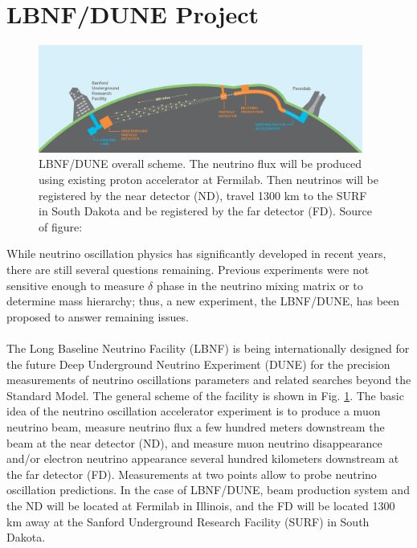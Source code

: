 
\section{LBNF/DUNE Project}
\begin{figure}
\caption{LBNF/DUNE overall scheme. The neutrino flux will be produced using existing proton accelerator at Fermilab. Then neutrinos will be registered by the near detector (ND), travel 1300 km to the SURF in South Dakota and be registered by the far detector (FD). Source of figure: \cite{ref_LBNFweb} }
\label{fig:LBNF_overallScheme}
\centering
\includegraphics[width=0.95\textwidth, keepaspectratio=true]{figs/LBNF_overallScheme.png} 
\end{figure}
While neutrino oscillation physics has significantly developed in recent years, there are still several questions remaining. Previous experiments were not sensitive enough to measure $\delta$ phase in the neutrino mixing matrix or to determine mass hierarchy; thus, a new experiment, the LBNF/DUNE, has been proposed to answer remaining issues.\\ \\
The Long Baseline Neutrino Facility (LBNF) is being internationally designed for the future Deep Underground Neutrino Experiment (DUNE) for the precision measurements of neutrino oscillations parameters and related searches beyond the Standard Model. The general scheme of the facility is shown in Fig. \ref{fig:LBNF_overallScheme}. The basic idea of the neutrino oscillation accelerator experiment is to produce a muon neutrino beam, measure neutrino flux a few hundred meters downstream the beam at the near detector (ND), and measure muon neutrino disappearance and/or electron neutrino appearance several hundred kilometers downstream at the far detector (FD). Measurements at two points allow to probe neutrino oscillation predictions. In the case of LBNF/DUNE, beam production system and the ND will be located at Fermilab in Illinois, and the FD will be located 1300 km away at the Sanford Underground Research Facility (SURF) in South Dakota. \\ \\
